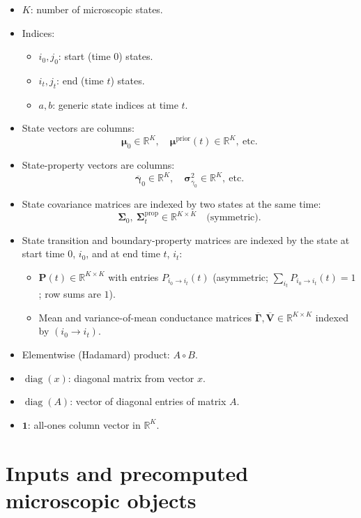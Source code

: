 \documentclass[11pt]{article}
\begin{document}
\begin{itemize}
  \item \(K\): number of microscopic states.
  \item Indices:
    \begin{itemize}
      \item \(i_0, j_0\): start (time \(0\)) states.
      \item \(i_t, j_t\): end (time \(t\)) states.
      \item \(a,b\): generic state indices at time \(t\).
    \end{itemize}
  \item State vectors are columns:
    \[
      \boldsymbol{\mu}_0 \in \mathbb{R}^K,\quad
      \boldsymbol{\mu}^{\text{prior}}(t)\in\mathbb{R}^K,\ \text{etc.}
    \]
  \item State-property vectors are columns:
    \[
      \overline{\boldsymbol{\gamma}}_0 \in \mathbb{R}^K,\quad
      \boldsymbol{\sigma}^2_{\overline{\gamma}_0}\in\mathbb{R}^K,\ \text{etc.}
    \]
  \item State covariance matrices are indexed by two states at the same time:
    \[
      \boldsymbol{\Sigma}_0,\ \boldsymbol{\Sigma}^{\text{prop}}_{t}\in\mathbb{R}^{K\times K}
      \quad\text{(symmetric).}
    \]
  \item State transition and boundary-property matrices are indexed by the state at start time \(0\), \(i_0\), and at end time \(t\), \(i_t\):
    \begin{itemize}
      \item \(\mathbf{P}(t)\in\mathbb{R}^{K\times K}\) with entries \(P_{i_0\to i_t}(t)\) (asymmetric; \(\sum_{i_t} P_{i_0\to i_t}(t)=1\); row sums are \(1\)).
      \item Mean and variance-of-mean conductance matrices
      \(\overline{\mathbf{\Gamma}},\overline{\mathbf{V}}\in\mathbb{R}^{K\times K}\) indexed by \((i_0 \to i_t)\).
    \end{itemize}
  \item Elementwise (Hadamard) product: \(A\circ B\).
  \item \(\operatorname{diag}(x)\): diagonal matrix from vector \(x\).
  \item \(\operatorname{diag}(A)\): vector of diagonal entries of matrix \(A\).
  \item \(\mathbf{1}\): all-ones column vector in \(\mathbb{R}^K\).
\end{itemize}

\section{Inputs and precomputed microscopic objects}
\end{document}
